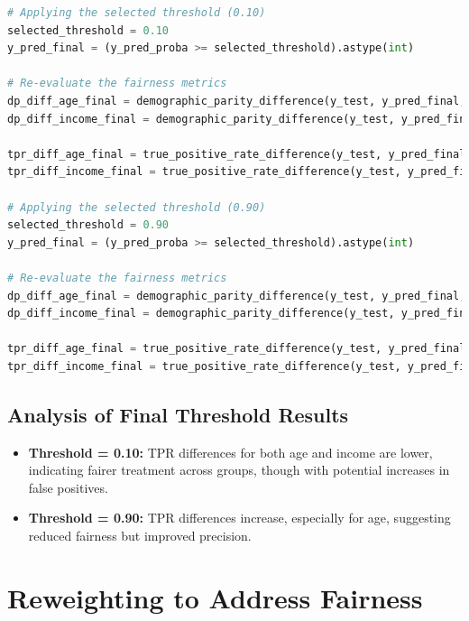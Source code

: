 \documentclass[12pt,a4paper]{report}
\begin{document}
\begin{lstlisting}[language=Python, caption={Applying Selected Thresholds}]
# Applying the selected threshold (0.10)
selected_threshold = 0.10  
y_pred_final = (y_pred_proba >= selected_threshold).astype(int)

# Re-evaluate the fairness metrics
dp_diff_age_final = demographic_parity_difference(y_test, y_pred_final, sensitive_features=X_test['customer_age'])
dp_diff_income_final = demographic_parity_difference(y_test, y_pred_final, sensitive_features=X_test['income'])

tpr_diff_age_final = true_positive_rate_difference(y_test, y_pred_final, sensitive_features=X_test['customer_age'])
tpr_diff_income_final = true_positive_rate_difference(y_test, y_pred_final, sensitive_features=X_test['income'])

# Applying the selected threshold (0.90)
selected_threshold = 0.90  
y_pred_final = (y_pred_proba >= selected_threshold).astype(int)

# Re-evaluate the fairness metrics
dp_diff_age_final = demographic_parity_difference(y_test, y_pred_final, sensitive_features=X_test['customer_age'])
dp_diff_income_final = demographic_parity_difference(y_test, y_pred_final, sensitive_features=X_test['income'])

tpr_diff_age_final = true_positive_rate_difference(y_test, y_pred_final, sensitive_features=X_test['customer_age'])
tpr_diff_income_final = true_positive_rate_difference(y_test, y_pred_final, sensitive_features=X_test['income'])
\end{lstlisting}

\subsection{Analysis of Final Threshold Results}

\begin{itemize}
    \item \textbf{Threshold = 0.10:} TPR differences for both age and income are lower, indicating fairer treatment across groups, though with potential increases in false positives.
    
    \item \textbf{Threshold = 0.90:} TPR differences increase, especially for age, suggesting reduced fairness but improved precision.
\end{itemize}

\section{Reweighting to Address Fairness}
\end{document}
